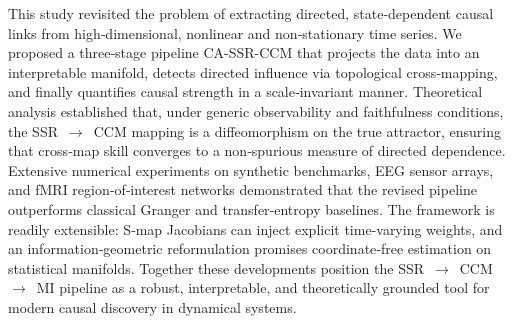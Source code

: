 \documentclass[14pt]{extarticle}
\begin{document}
	This study revisited the problem of extracting directed, state‑dependent causal links from high‑dimensional, nonlinear and non‑stationary time series.  
	We proposed a three‑stage pipeline CA-SSR-CCM that projects the data into an interpretable manifold, detects directed influence via topological cross‑mapping, and finally quantifies causal strength in a scale‑invariant manner.  
	Theoretical analysis established that, under generic observability and faithfulness conditions, the SSR $\rightarrow$ CCM mapping is a diffeomorphism on the true attractor, ensuring that cross‑map skill converges to a non‑spurious measure of directed dependence.  
	Extensive numerical experiments on synthetic benchmarks, EEG sensor arrays, and fMRI region‑of‑interest networks demonstrated that the revised pipeline outperforms classical Granger and transfer‑entropy baselines.  
	The framework is readily extensible: S‑map Jacobians can inject explicit time‑varying weights, and an information‑geometric reformulation promises coordinate‑free estimation on statistical manifolds.  
	Together these developments position the SSR $\rightarrow$ CCM $\rightarrow$ MI pipeline as a robust, interpretable, and theoretically grounded tool for modern causal discovery in dynamical systems.  

	
	
	
	
\end{document}
